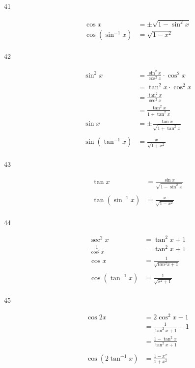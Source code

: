 \documentclass{exam}
\begin{document}
\begin{description}
      \item[41]
        \begin{align*}
          \cos x &= \pm \sqrt{1 - \sin^2 x } \\
          \cos \left( \sin^{-1} x \right) & = \boxed{ \sqrt{ 1 - x^2} } \\
        \end{align*}

      \item[42]
        \begin{align*}
          \sin^2 x & = \frac{\sin^2 x}{\cos^2 x} \cdot \cos^2 x \\
                   & = \tan^2 x \cdot \cos^2 x \\
                   & = \frac{\tan^2 x}{\sec^2 x} \\
                   & = \frac{\tan^2 x}{1 + \tan^2 x} \\
          \sin x   & = \pm \frac{ \tan x }{ \sqrt{1 + \tan^2 x} } \\
          \\
          \sin \left( \tan^{-1} x \right) &= \boxed{ \frac{x}{\sqrt{1 + x^2}} } \\
        \end{align*}

      \item[43]
        \begin{align*}
          \tan x & = \frac{\sin x}{\sqrt{1 - \sin^2 x}} \\
          \\
          \tan \left( \sin^{-1} x \right) &= \boxed{ \frac{x}{\sqrt{1 - x^2}} } \\
        \end{align*}

      \item[44]
        \begin{align*}
           \sec^2 x &= \tan^2 x + 1 \\
           \frac{1}{\cos^2 x} &= \tan^2 x + 1 \\
           \cos x &= \frac{1}{\sqrt{tan^2 x + 1}} \\
           \\
           \cos \left( \tan^{-1} x \right) &= \frac{1}{\sqrt{x^2 + 1}} \\
        \end{align*}

      \item[45]
        \begin{align*}
          \cos 2x & = 2 \cos^2 x - 1 \\
                  & = \frac{1}{\tan^2 x + 1} - 1 \\
                  & = \frac{1- \tan^2 x}{\tan^2 x + 1} \\
          \\
          \cos \left( 2 \tan^{-1} x \right) & = \boxed{ \frac{1 - x^2}{1 + x^2} } \\
        \end{align*}


\end{description}
\end{document}
